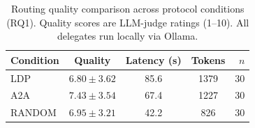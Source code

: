 \begin{table}[t]
\centering
\caption{Routing quality comparison across protocol conditions (RQ1). Quality scores are LLM-judge ratings (1--10). All delegates run locally via Ollama.}
\label{tab:routing-overview}
\begin{tabular}{lcccr}
\toprule
Condition & Quality & Latency (s) & Tokens & $n$ \\
\midrule
LDP & $6.80 \pm 3.62$ & 85.6 & 1379 & 30 \\
A2A & $7.43 \pm 3.54$ & 67.4 & 1227 & 30 \\
RANDOM & $6.95 \pm 3.21$ & 42.2 & 826 & 30 \\
\bottomrule
\end{tabular}
\end{table}